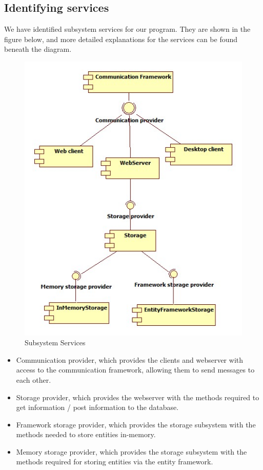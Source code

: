 \subsection{Identifying services}
We have identified subsystem services for our program. They are shown in the figure below, and more detailed explanations for the services can be found beneath the diagram.

\begin{figure}[H]
\includegraphics[scale=0.8]{img/SDD/SubsystemServices.jpg}
\caption{Subsystem Services}
\label{fig:Subsystem Services}
\end{figure}


\begin{itemize}
	\item Communication provider, which provides the clients and webserver with access to the communication framework, allowing them to send messages to each other.
	\item Storage provider, which provides the webserver with the methods required to get information / post information to the database.
	\item Framework storage provider, which provides the storage subsystem with the methods needed to store entities in-memory.
	\item Memory storage provider, which provides the storage subsystem with the methods required for storing entities via the entity framework.
\end{itemize}

